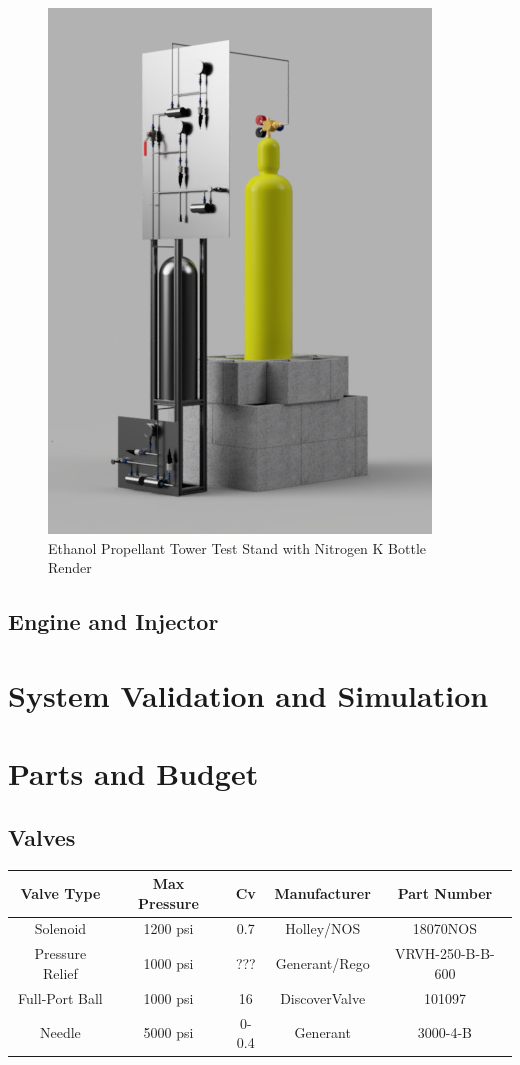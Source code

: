 \documentclass[9pt]{article} %
\numberwithin{equation}{section} %
\begin{document}
\begin{figure}[!htb] 
    \centering
    \includegraphics[scale=2]{master_stand_overall_render_2.png} %
    \caption{Ethanol Propellant Tower Test Stand with Nitrogen K Bottle Render}
    \label{fig:ethanol_tank_stand_with_nitrogen_render}
\end{figure}

\subsection{Engine and Injector}

\section{System Validation and Simulation} \label{sec: system_validation}

\section{Parts and Budget}

\subsection{Valves}
\begin{center}
 \begin{tabular}{|c c c c c|} 
 \hline
 Valve Type & Max Pressure & Cv & Manufacturer & Part Number\\
 \hline\hline
 Solenoid & 1200 psi & 0.7 & Holley/NOS & 18070NOS\\ 
 \hline
 Pressure Relief & 1000 psi & ??? & Generant/Rego & VRVH-250-B-B-600\\
 \hline
 Full-Port Ball & 1000 psi & 16 & DiscoverValve & 101097	\\
 \hline
 Needle & 5000 psi & 0-0.4 & Generant & 3000-4-B\\ 
 \hline
\end{tabular}
\end{center}
\end{document}
